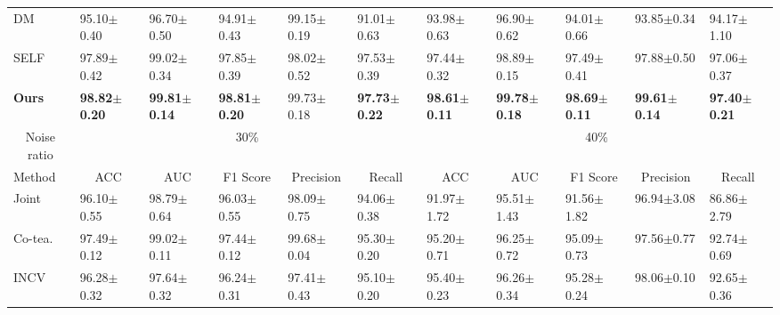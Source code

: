 \begin{table*}[]
\begin{tabular}{@{}lllllllllll@{}}
DM                       & 95.10$\pm$0.40          & 96.70$\pm$0.50          & 94.91$\pm$0.43               & 99.15$\pm$0.19          & 91.01$\pm$0.63             & 93.98$\pm$0.63          & 96.90$\pm$0.62          & 94.01$\pm$0.66               & 93.85$\pm$0.34          & 94.17$\pm$1.10             \\
SELF                            & 97.89$\pm$0.42          & 99.02$\pm$0.34          & 97.85$\pm$0.39               & 98.02$\pm$0.52          & 97.53$\pm$0.39             & 97.44$\pm$0.32          & 98.89$\pm$0.15          & 97.49$\pm$0.41               & 97.88$\pm$0.50          & 97.06$\pm$0.37             \\
\textbf{Ours}                   & \textbf{98.82$\pm$0.20} & \textbf{99.81$\pm$0.14} & \textbf{98.81$\pm$0.20}      & 99.73$\pm$0.18          & \textbf{97.73$\pm$0.22}    & \textbf{98.61$\pm$0.11} & \textbf{99.78$\pm$0.18} & \textbf{98.69$\pm$0.11}      & \textbf{99.61$\pm$0.14} & \textbf{97.40$\pm$0.21}    \\ \midrule
\multicolumn{1}{c}{Noise ratio} & \multicolumn{5}{c}{30\%}                                                                                                                & \multicolumn{5}{c}{40\%}                                                                                                                \\ \midrule
Method                & \multicolumn{1}{c}{ACC} & \multicolumn{1}{c}{AUC} & \multicolumn{1}{c}{F1 Score} & \multicolumn{1}{c}{{Precision}} & \multicolumn{1}{c}{Recall} & \multicolumn{1}{c}{ACC} & \multicolumn{1}{c}{AUC} & \multicolumn{1}{c}{F1 Score} & \multicolumn{1}{c}{{Precision}} & \multicolumn{1}{c}{Recall} \\ \midrule
Joint                     & 96.10$\pm$0.55          & 98.79$\pm$0.64          & 96.03$\pm$0.55               & 98.09$\pm$0.75          & 94.06$\pm$0.38             & 91.97$\pm$1.72          & 95.51$\pm$1.43          & 91.56$\pm$1.82               & 96.94$\pm$3.08          & 86.86$\pm$2.79             \\
Co-tea.                     & 97.49$\pm$0.12          & 99.02$\pm$0.11          & 97.44$\pm$0.12               & 99.68$\pm$0.04          & 95.30$\pm$0.20             & 95.20$\pm$0.71          & 96.25$\pm$0.72          & 95.09$\pm$0.73               & 97.56$\pm$0.77          & 92.74$\pm$0.69             \\
INCV                            & 96.28$\pm$0.32          & 97.64$\pm$0.32          & 96.24$\pm$0.31               & 97.41$\pm$0.43          & 95.10$\pm$0.20             & 95.40$\pm$0.23          & 96.26$\pm$0.34          & 95.28$\pm$0.24               & 98.06$\pm$0.10          & 92.65$\pm$0.36             \\

\end{tabular}
\end{table*}
